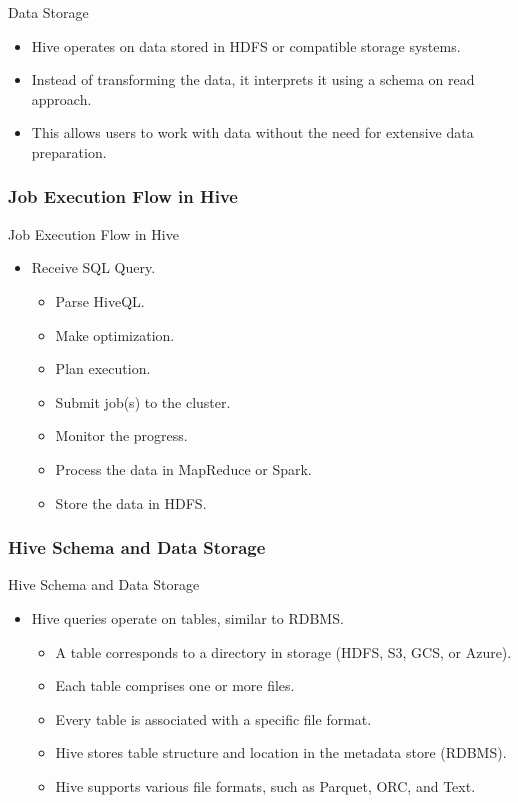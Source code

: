 \begin{frame}{Data Storage}
\begin{itemize}
    \item Hive operates on data stored in HDFS or compatible storage systems.
    \item Instead of transforming the data, it interprets it using a schema on read approach.
    \item This allows users to work with data without the need for extensive data preparation.
\end{itemize}
\end{frame}
\subsubsection{Job Execution Flow in Hive}
\begin{frame}{Job Execution Flow in Hive}
	\begin{itemize}
		\item Receive SQL Query.
		\begin{itemize}
			\item Parse HiveQL.
			\item Make optimization.
			\item Plan execution.
			\item Submit job(s) to the cluster.
			\item Monitor the progress.
			\item Process the data in MapReduce or Spark.
			\item Store the data in HDFS.
		\end{itemize}
	\end{itemize}
	\end{frame}
\subsubsection{Hive Schema and Data Storage}
\begin{frame}{Hive Schema and Data Storage}
	\begin{itemize}
		\item Hive queries operate on tables, similar to RDBMS.
		\begin{itemize}
			\item A table corresponds to a directory in storage (HDFS, S3, GCS, or Azure).
			\item Each table comprises one or more files.
			\item Every table is associated with a specific file format.
			\item Hive stores table structure and location in the metadata store (RDBMS).
			\item Hive supports various file formats, such as Parquet, ORC, and Text.
		\end{itemize}
	\end{itemize}
\end{frame}


